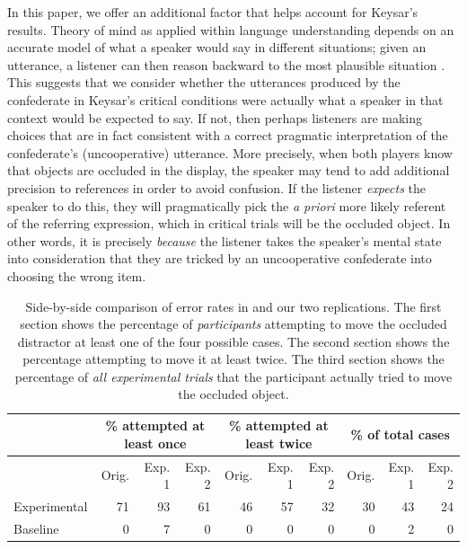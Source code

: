 \documentclass[10pt,letterpaper]{article}
\begin{document}
In this paper, we offer an additional factor that helps account for Keysar's results. 
Theory of mind as applied within language understanding depends on an accurate model of what a speaker would say in different situations; given an utterance, a listener can then reason backward to the most plausible situation \cite{Grice75_LogicConversation,Clark96_UsingLanguage,FrankGoodman12_PragmaticReasoningLanguageGames, GoodmanStuhlmuller13_KnowledgeImplicature}.
This suggests that we consider whether the utterances produced by the confederate in Keysar's critical conditions were actually what a speaker in that context would be expected to say. 
If not, then perhaps listeners are making choices that are in fact consistent with a correct pragmatic interpretation of the confederate's (uncooperative) utterance.
More precisely, when both players know that objects are occluded in the display, the speaker may tend to add additional precision to references in order to avoid confusion. If the listener \emph{expects} the speaker to do this, they will pragmatically pick the \emph{a priori} more likely referent of the referring expression, which in critical trials will be the occluded object. In other words, it is precisely \emph{because} the listener takes the speaker's mental state into consideration that they are tricked by an uncooperative confederate into choosing the wrong item. 
\begin{table}
\begin{center}
\begin{tabular}{ p{2cm} | r | r |  r || r | r | r || r | r | r}
& \multicolumn{3}{c||}{\% attempted at least once} & \multicolumn{3}{c||}{\% attempted at least twice} & \multicolumn{3}{c}{\% of total cases}\\
\hline
& Orig. & Exp. 1 & Exp. 2 & Orig. & Exp. 1 & Exp. 2 & Orig. & Exp. 1 & Exp. 2  \\
Experimental & 71 & 93 & 61 & 46 & 57 & 32 & 30 & 43 & 24\\
Baseline        & 0   & 7   & 0   & 0   & 0   & 0   & 0   & 2   & 0\\
\end{tabular}
\caption{Side-by-side comparison of error rates in  and our two replications. The first section shows the percentage of \emph{participants} attempting to move the occluded distractor at least one of the four possible cases. The second section shows the percentage attempting to move it at least twice. The third section shows the percentage of \emph{all experimental trials} that the participant actually tried to move the occluded object. }
\label{table:mainResults}
\end{center}
\end{table}
\end{document}
